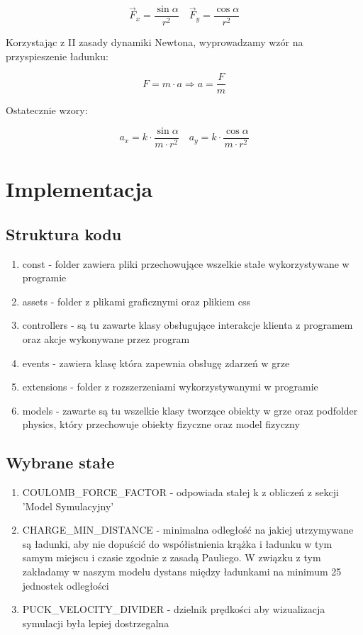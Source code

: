 \documentclass{article}
\begin{document}
$$
\vec{F}_{x}=\frac{\sin \alpha}{r^{2}} \quad \vec{F}_{y}=\frac{\cos \alpha}{r^{2}}
$$

\noindent Korzystając z II zasady dynamiki Newtona, wyprowadzamy wzór na przyspieszenie ładunku:

$$
F=m \cdot a \Rightarrow a=\frac{F}{m}
$$

\noindent Ostatecznie wzory:

$$
a_{x}=k \cdot \frac{\sin \alpha}{m \cdot r^{2}} \quad a_{y}=k \cdot \frac{\cos \alpha}{m \cdot r^{2}}
$$


\section{Implementacja}
\subsection{Struktura kodu}
\begin{enumerate}
    \item const - folder zawiera pliki przechowujące wszelkie stałe wykorzystywane w programie
    \item assets - folder z plikami graficznymi oraz plikiem css
    \item controllers - są tu zawarte klasy obsługujące interakcje klienta z programem oraz akcje wykonywane przez program
    \item events - zawiera klasę która zapewnia obsługę zdarzeń w grze
    \item extensions - folder z rozszerzeniami wykorzystywanymi w programie
    \item models - zawarte są tu wszelkie klasy tworzące obiekty w grze oraz podfolder physics, który przechowuje obiekty fizyczne oraz model fizyczny
\end{enumerate}
\subsection{Wybrane stałe}
\begin{enumerate}
    \item COULOMB\_FORCE\_FACTOR - odpowiada stałej k z obliczeń z sekcji 'Model Symulacyjny'
    \item CHARGE\_MIN\_DISTANCE - minimalna odległość na jakiej utrzymywane są ładunki, aby nie dopuścić do współistnienia krążka i ładunku w tym samym miejscu i czasie zgodnie z zasadą Pauliego. W związku z tym zakładamy w naszym modelu dystans między ładunkami na minimum 25 jednostek odległości
    \item PUCK\_VELOCITY\_DIVIDER - dzielnik prędkości aby wizualizacja symulacji była lepiej dostrzegalna
\end{enumerate}
\end{document}
